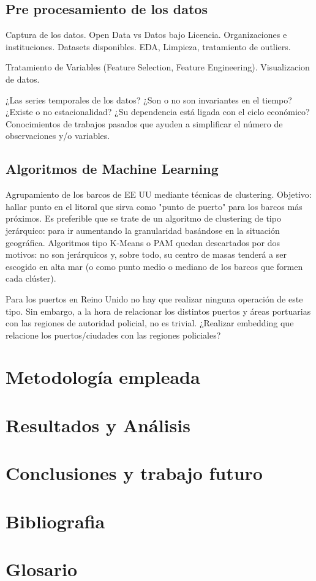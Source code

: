 \documentclass{article}
\begin{document}
\subsection{Pre procesamiento de los datos}
Captura de los datos. Open Data vs Datos bajo Licencia. Organizaciones e instituciones. Datasets disponibles.
EDA, Limpieza, tratamiento de outliers.

Tratamiento de Variables (Feature Selection, Feature Engineering).
Visualizacion de datos.

¿Las series temporales de los datos? ¿Son o no son invariantes en el tiempo?¿Existe o no estacionalidad? ¿Su dependencia está ligada con el ciclo económico?
Conocimientos de trabajos pasados que ayuden a simplificar el número de observaciones y/o variables.
\subsection{Algoritmos de Machine Learning}
Agrupamiento de los barcos de EE UU mediante técnicas de clustering. Objetivo: hallar punto en el litoral que sirva como "punto de puerto" para los barcos más próximos. Es preferible que se trate de un algoritmo de clustering de tipo jerárquico: para ir aumentando la granularidad basándose en la situación geográfica.
Algoritmos tipo K-Means o PAM quedan descartados por dos motivos: no son jerárquicos y, sobre todo, su centro de masas tenderá a ser escogido en alta mar (o como punto medio o mediano de los barcos que formen cada clúster).

Para los puertos en Reino Unido no hay que realizar ninguna operación de este tipo. Sin embargo, a la hora de relacionar los distintos puertos y áreas portuarias con las regiones de autoridad policial, no es trivial. ¿Realizar embedding que relacione los puertos/ciudades con las regiones policiales?

\section{Metodología empleada}

\section{Resultados y Análisis}

\section{Conclusiones y trabajo futuro}

\section{Bibliografia}

\section{Glosario}
\end{document}
